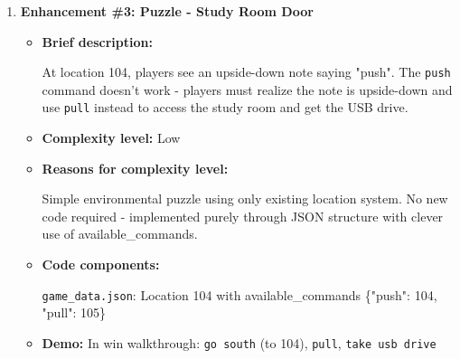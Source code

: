 \documentclass[11pt]{article}
\begin{document}
\begin{enumerate}
\begin{itemize}
        \item \textbf{Complexity level:} Medium
        
        \item \textbf{Reasons for complexity level:}
        
        Required creating NPC dataclass, loading from JSON, name normalization, conditional dialogue system, state management, and integration into game loop. Approximately 60 lines of new code.
        
        \item \textbf{Code components:}
        
        \texttt{game\_entities.py}: \texttt{NPC} dataclass
        
        \texttt{adventure.py}: \texttt{\_find\_npc\_here()}, \texttt{talk\_to()} methods
        
        \texttt{game\_data.json}: NPC definitions
        
        \item \textbf{Demo:} Included in win walkthrough with \texttt{talk to the cafeteria staff}
    \end{itemize}

    \item \textbf{Enhancement \#3: Puzzle - Study Room Door}
    \begin{itemize}
        \item \textbf{Brief description:}
        
        At location 104, players see an upside-down note saying "push". The \texttt{push} command doesn't work - players must realize the note is upside-down and use \texttt{pull} instead to access the study room and get the USB drive.
        
        \item \textbf{Complexity level:} Low
        
        \item \textbf{Reasons for complexity level:}
        
        Simple environmental puzzle using only existing location system. No new code required - implemented purely through JSON structure with clever use of available\_commands.
        
        \item \textbf{Code components:}
        
        \texttt{game\_data.json}: Location 104 with available\_commands \{"push": 104, "pull": 105\}
        
        \item \textbf{Demo:} In win walkthrough: \texttt{go south} (to 104), \texttt{pull}, \texttt{take usb drive}
    \end{itemize}
\end{enumerate}
\end{document}
